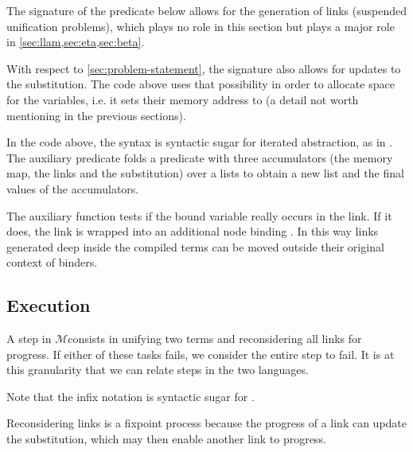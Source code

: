 \documentclass[sigconf,natbib=false,review]{acmart}
\newcommand{\UnifRel}{\ensuremath{\simeq}}
\newcommand{\Ue}{\ensuremath{\UnifRel_m}\xspace}
\newcommand{\Ho}{\texorpdfstring{\ensuremath{\mathcal{M}}\xspace}{M}}
\begin{document}
The signature of the  predicate below allows for the generation of
links (suspended unification problems), which plays no role in this section
but plays a major role in \cref{sec:llam,sec:eta,sec:beta}.




\noindent
With respect to \cref{sec:problem-statement}, the signature also allows
for updates to the substitution.
The code above uses that possibility
in order to allocate space for the variables, i.e. it sets their memory
address to  (a detail not worth mentioning in the
previous sections).



\noindent
In the code above, the syntax  is syntactic sugar for
iterated  abstraction, as in .
The auxiliary predicate  folds a predicate
with three accumulators (the memory map, the links and the substitution)
over a lists to obtain a new list and the final values of the
accumulators.

The auxiliary function  tests if the bound variable
 really occurs in the link. If it does, the link is wrapped into
an additional  node binding . In this way links generated
deep inside the compiled terms can be moved outside their original context
of binders.




\subsection{Execution}
\label{sec:execution}

A step in \Ho consists in unifying two terms and reconsidering all
links for progress. If either of these tasks fails, we consider the entire step to
fail. It is at this granularity that we can relate steps in the
two languages.




\noindent
Note that the infix notation \elpiIn{((A ~\Ue~B) C D)} is syntactic sugar for
\elpiIn{((~\Ue\!\!\!~) A B C D)}.

Reconsidering links is a fixpoint process because the progress of a link
can update the substitution, which may then enable another link to progress.
\end{document}
